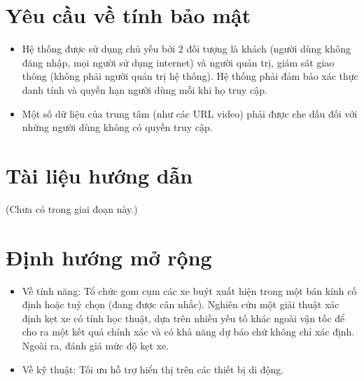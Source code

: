 \section{Yêu cầu về tính bảo mật}
\begin{itemize}
	\item Hệ thống được sử dụng chủ yếu bởi 2 đối tượng là khách (người dùng không đăng nhập, mọi người sử dụng internet) và người quản trị, giám sát giao thông (không phải người quản trị hệ thống). Hệ thống phải đảm bảo xác thực danh tính và quyền hạn người dùng mỗi khi họ truy cập.
	\item Một số dữ liệu của trung tâm (như các URL video) phải được che dấu đối với những người dùng không có quyền truy cập.
\end{itemize}

\section{Tài liệu hướng dẫn}
(Chưa có trong giai đoạn này.)

\section{Định hướng mở rộng}

\begin{itemize}
	\item Về tính năng:
	\subitem Tổ chức gom cụm các xe buýt xuất hiện trong một bán kính cố định hoặc tuỳ chọn (đang được cân nhắc).
	\subitem Nghiên cứu một giải thuật xác định kẹt xe có tính học thuật, dựa trên nhiều yếu tố khác ngoài vận tốc để cho ra một kết quả chính xác và có khả năng dự báo chứ không chỉ xác định. Ngoài ra, đánh giá mức độ kẹt xe.

	\item Về kỹ thuật:
	\subitem Tối ưu hỗ trợ hiển thị trên các thiết bị di động.
\end{itemize}


